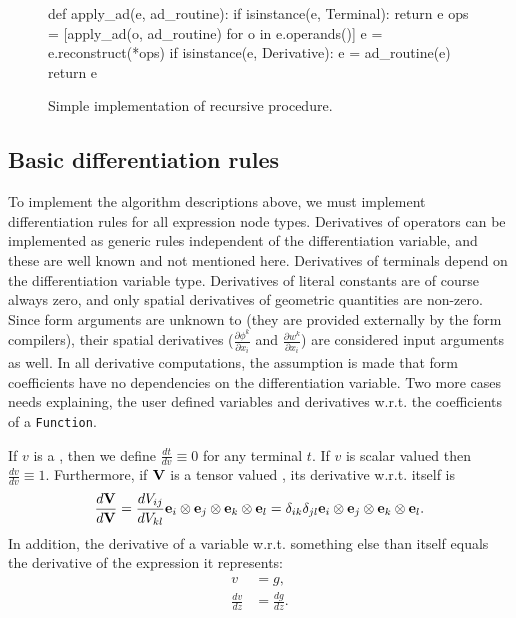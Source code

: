 
\begin{figure}[ht]
\begin{code}
def apply_ad(e, ad_routine):
    if isinstance(e, Terminal):
        return e
    ops = [apply_ad(o, ad_routine) for o in e.operands()]
    e = e.reconstruct(*ops)
    if isinstance(e, Derivative):
        e = ad_routine(e)
    return e
\end{code}
\caption{Simple implementation of recursive  procedure.}
\label{ufl:fig:applyad}
\end{figure}

\subsection{Basic differentiation rules}

To implement the algorithm descriptions above, we must implement
differentiation rules for all expression node types. Derivatives of
operators can be implemented as generic rules independent of the
differentiation variable, and these are well known and not mentioned
here. Derivatives of terminals depend on the differentiation variable
type.  Derivatives of literal constants are of course always zero, and
only spatial derivatives of geometric quantities are non-zero.  Since
form arguments are unknown to \ufl{} (they are provided externally by
the form compilers), their spatial derivatives ($\frac{\partial
\phi^k}{\partial x_i}$ and $\frac{\partial w^k}{\partial x_i}$) are
considered input arguments as well.  In all derivative computations,
the assumption is made that form coefficients have no dependencies on
the differentiation variable.  Two more cases needs explaining, the
user defined variables and derivatives w.r.t. the coefficients of a
\texttt{Function}.

If $v$ is a , then we define $\frac{d t}{d v} \equiv
0$ for any terminal $t$. If $v$ is scalar valued then $\frac{d v}{d v}
\equiv 1$. Furthermore, if $\mathbf{V}$ is a tensor valued ,
its derivative w.r.t. itself is
\begin{align}
\frac{d \mathbf{V}}{d \mathbf{V}}
    =
    \frac{d V_{ij}}{d V_{kl}}
    \mathbf{e}_i\otimes\mathbf{e}_j\otimes\mathbf{e}_k\otimes\mathbf{e}_l
    =
    \delta_{ik}\delta_{jl}
    \mathbf{e}_i\otimes\mathbf{e}_j\otimes\mathbf{e}_k\otimes\mathbf{e}_l .
\end{align}
In addition, the derivative of a variable w.r.t. something else than
itself equals the derivative of the expression it represents:
\begin{align}
v &= g, \\
\frac{d v}{d z} &= \frac{d g}{d z}.
\end{align}

